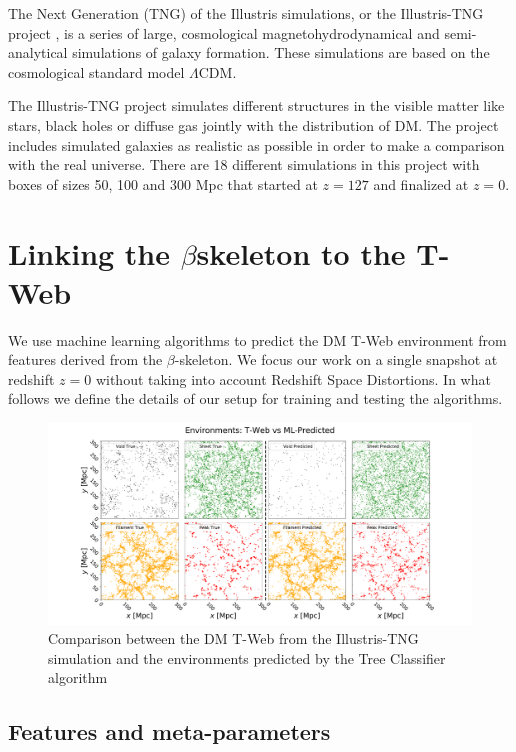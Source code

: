 \documentclass[usenatbib]{mnras}
\begin{document}
The Next Generation (TNG) of the Illustris simulations, or the Illustris-TNG project \citep{Nelson2015}, 
is a series of large, cosmological magnetohydrodynamical and semi-analytical simulations of
galaxy formation. These simulations are based on the cosmological standard model $\Lambda$CDM.

The Illustris-TNG project simulates different structures in the visible matter like stars, black
holes or diffuse gas jointly with the distribution of DM. 
The project includes simulated galaxies as realistic as possible in order to make a comparison
with the real universe.
There are 18 different simulations in this project with boxes of sizes 50, 100 and 300 Mpc
that started at  $z=127$ and finalized at $z=0$. 


\section{Linking the \texorpdfstring{$\beta$}-skeleton to the T-Web}\label{sec:link}

We use machine learning algorithms to predict the DM T-Web environment from features derived from the $\beta$-skeleton.
We focus our work on a single snapshot at redshift $z=0$ without taking into
account Redshift Space Distortions.
In what follows we define the details of our setup for training and testing the algorithms.

\begin{figure}
  \centering 
    \includegraphics[scale=0.32]{Figs/p_environment_predicted.pdf}
    \caption{Comparison between the DM T-Web from the Illustris-TNG simulation and the environments predicted by the Tree Classifier algorithm}
    \label{fig:prediction}
\end{figure}

\subsection{Features and meta-parameters}
\end{document}
